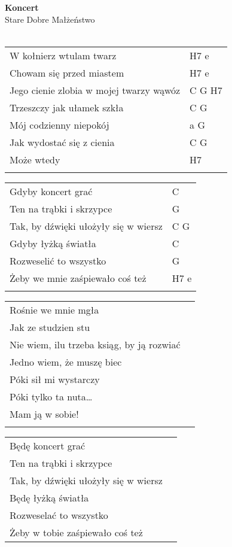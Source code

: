 \documentclass[a5paper]{article}
\begin{document}


\noindent
\fontsize{12pt}{15pt}\selectfont
\textbf{Koncert} \\
\fontsize{8pt}{10pt}\selectfont
Stare Dobre Małżeństwo \\ \\
\fontsize{10pt}{12pt}\selectfont
{}
\begin{tabular}{@{}p{8.50cm}p{3cm}@{}}
\noindent
W kołnierz wtulam twarz & H7 e \\
Chowam się przed miastem & H7 e \\
Jego cienie zlobia w mojej twarzy wąwóz & C G H7 \\
Trzeszczy jak ułamek szkła & C G \\
Mój codzienny niepokój & a G \\
Jak wydostać się z cienia & C G \\
Może wtedy & H7 \\ \\
\end{tabular}

\noindent
\begin{tabular}{@{}p{7.50cm}p{3cm}@{}}
Gdyby koncert grać & C \\
Ten na trąbki i skrzypce & G \\
Tak, by dźwięki ułożyły się w wiersz & C G \\
Gdyby łyżką światła & C \\
Rozweselić to wszystko & G \\
Żeby we mnie zaśpiewało coś też & H7 e \\ \\
\end{tabular}

\noindent
\begin{tabular}{@{}p{7.50cm}p{3cm}@{}}
Rośnie we mnie mgła \\
Jak ze studzien stu \\
Nie wiem, ilu trzeba ksiąg, by ją rozwiać \\
Jedno wiem, że muszę biec \\
Póki sił mi wystarczy \\
Póki tylko ta nuta… \\
Mam ją w sobie! \\ \\
\end{tabular}

\noindent
\begin{tabular}{@{}p{7.50cm}p{3cm}@{}}
Będę koncert grać \\
Ten na trąbki i skrzypce \\
Tak, by dźwięki ułożyły się w wiersz \\
Będę łyżką światła \\
Rozweselać to wszystko \\
Żeby w tobie zaśpiewało coś też 
\end{tabular}
\end{document}

